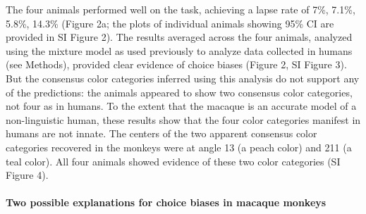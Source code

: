 The four animals performed well on the task, achieving a lapse rate of 7\%, 7.1\%, 5.8\%, 14.3\% (Figure 2a; the plots of individual animals showing 95\% CI are provided in SI Figure 2). The results averaged across the four animals, analyzed using the mixture model as used previously to analyze data collected in humans \citep{bae_why_2015,zhang_discrete_2008} (see Methods), provided clear evidence of choice biases (Figure 2, SI Figure 3). But the consensus color categories inferred using this analysis do not support any of the predictions: the animals appeared to show two consensus color categories, not four as in humans. To the extent that the macaque is an accurate model of a non-linguistic human, these results show that the four color categories manifest in humans are not innate. The centers of the two apparent consensus color categories recovered in the monkeys were at angle 13 (a peach color) and 211 (a teal color). All four animals showed evidence of these two color categories (SI Figure 4).

\paragraph{Two possible explanations for choice biases in macaque monkeys}

